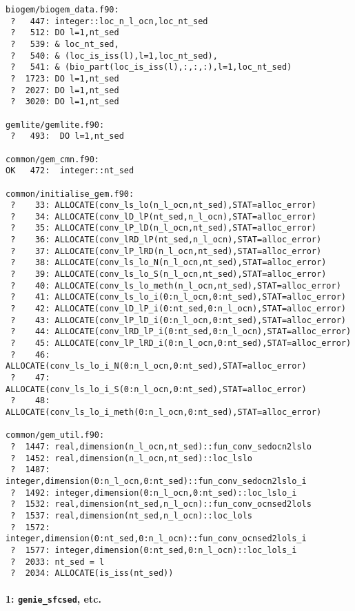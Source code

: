 \documentclass[a4paper,10pt,article]{memoir}
\begin{document}
\begin{small}
\begin{verbatim}
biogem/biogem_data.f90:
 ?   447: integer::loc_n_l_ocn,loc_nt_sed
 ?   512: DO l=1,nt_sed
 ?   539: & loc_nt_sed,
 ?   540: & (loc_is_iss(l),l=1,loc_nt_sed),
 ?   541: & (bio_part(loc_is_iss(l),:,:,:),l=1,loc_nt_sed)
 ?  1723: DO l=1,nt_sed
 ?  2027: DO l=1,nt_sed
 ?  3020: DO l=1,nt_sed

gemlite/gemlite.f90:
 ?   493:  DO l=1,nt_sed

common/gem_cmn.f90:
OK   472:  integer::nt_sed

common/initialise_gem.f90:
 ?    33: ALLOCATE(conv_ls_lo(n_l_ocn,nt_sed),STAT=alloc_error)
 ?    34: ALLOCATE(conv_lD_lP(nt_sed,n_l_ocn),STAT=alloc_error)
 ?    35: ALLOCATE(conv_lP_lD(n_l_ocn,nt_sed),STAT=alloc_error)
 ?    36: ALLOCATE(conv_lRD_lP(nt_sed,n_l_ocn),STAT=alloc_error)
 ?    37: ALLOCATE(conv_lP_lRD(n_l_ocn,nt_sed),STAT=alloc_error)
 ?    38: ALLOCATE(conv_ls_lo_N(n_l_ocn,nt_sed),STAT=alloc_error)
 ?    39: ALLOCATE(conv_ls_lo_S(n_l_ocn,nt_sed),STAT=alloc_error)
 ?    40: ALLOCATE(conv_ls_lo_meth(n_l_ocn,nt_sed),STAT=alloc_error)
 ?    41: ALLOCATE(conv_ls_lo_i(0:n_l_ocn,0:nt_sed),STAT=alloc_error)
 ?    42: ALLOCATE(conv_lD_lP_i(0:nt_sed,0:n_l_ocn),STAT=alloc_error)
 ?    43: ALLOCATE(conv_lP_lD_i(0:n_l_ocn,0:nt_sed),STAT=alloc_error)
 ?    44: ALLOCATE(conv_lRD_lP_i(0:nt_sed,0:n_l_ocn),STAT=alloc_error)
 ?    45: ALLOCATE(conv_lP_lRD_i(0:n_l_ocn,0:nt_sed),STAT=alloc_error)
 ?    46: ALLOCATE(conv_ls_lo_i_N(0:n_l_ocn,0:nt_sed),STAT=alloc_error)
 ?    47: ALLOCATE(conv_ls_lo_i_S(0:n_l_ocn,0:nt_sed),STAT=alloc_error)
 ?    48: ALLOCATE(conv_ls_lo_i_meth(0:n_l_ocn,0:nt_sed),STAT=alloc_error)

common/gem_util.f90:
 ?  1447: real,dimension(n_l_ocn,nt_sed)::fun_conv_sedocn2lslo
 ?  1452: real,dimension(n_l_ocn,nt_sed)::loc_lslo
 ?  1487: integer,dimension(0:n_l_ocn,0:nt_sed)::fun_conv_sedocn2lslo_i
 ?  1492: integer,dimension(0:n_l_ocn,0:nt_sed)::loc_lslo_i
 ?  1532: real,dimension(nt_sed,n_l_ocn)::fun_conv_ocnsed2lols
 ?  1537: real,dimension(nt_sed,n_l_ocn)::loc_lols
 ?  1572: integer,dimension(0:nt_sed,0:n_l_ocn)::fun_conv_ocnsed2lols_i
 ?  1577: integer,dimension(0:nt_sed,0:n_l_ocn)::loc_lols_i
 ?  2033: nt_sed = l
 ?  2034: ALLOCATE(is_iss(nt_sed))
\end{verbatim}
\end{small}

\paragraph{1: \texttt{genie\_sfcsed}, etc.}
\end{document}
